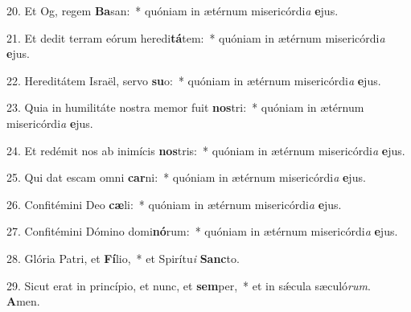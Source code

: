 20. Et Og, regem \textbf{Ba}san:~*  quóniam in ætérnum misericórdi\textit{a} \textbf{e}jus.\

21. Et dedit terram eórum heredi\textbf{tá}tem:~*  quóniam in ætérnum misericórdi\textit{a} \textbf{e}jus.\

22. Hereditátem Israël, servo \textbf{su}o:~*  quóniam in ætérnum misericórdi\textit{a} \textbf{e}jus.\

23. Quia in humilitáte nostra memor fuit \textbf{nos}tri:~*  quóniam in ætérnum misericórdi\textit{a} \textbf{e}jus.\

24. Et redémit nos ab inimícis \textbf{nos}tris:~*  quóniam in ætérnum misericórdi\textit{a} \textbf{e}jus.\

25. Qui dat escam omni \textbf{car}ni:~*  quóniam in ætérnum misericórdi\textit{a} \textbf{e}jus.\

26. Confitémini Deo \textbf{cæ}li:~*  quóniam in ætérnum misericórdi\textit{a} \textbf{e}jus.\

27. Confitémini Dómino domi\textbf{nó}rum:~*  quóniam in ætérnum misericórdi\textit{a} \textbf{e}jus.\

28. Glória Patri, et \textbf{Fí}lio,~*  et Spirítu\textit{i} \textbf{Sanc}to.\

29. Sicut erat in princípio, et nunc, et \textbf{sem}per,~*  et in sǽcula sæculó\textit{rum}. \textbf{A}men.\

